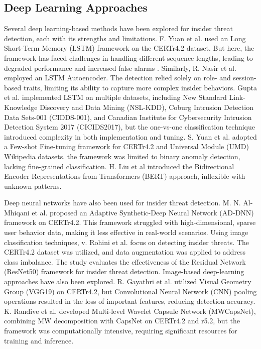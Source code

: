 \subsection{Deep Learning Approaches}
Several deep learning-based methods have been explored for insider threat detection, each with its strengths and limitations. F. Yuan et al. \cite{yuan2019attention} used an Long Short-Term Memory (LSTM) framework on the CERTr4.2 dataset. But here, the framework has faced challenges in handling different sequence lengths, leading to degraded performance and increased false alarms \cite{sivakrishna2023aubit}. Similarly, R. Nasir et al. \cite{nasir2021behavioral} employed an LSTM Autoencoder. The detection relied solely on role- and session-based traits, limiting its ability to capture more complex insider behaviors. Gupta et al. \cite{gupta2021lio} implemented LSTM on multiple datasets, including New Standard Link-Knowledge Discovery and Data Mining (NSL-KDD), Coburg Intrusion Detection Data Sets-001 (CIDDS-001), and Canadian Institute for Cybersecurity Intrusion Detection System 2017 (CICIDS2017), but the one-vs-one classification technique introduced complexity in both implementation and tuning. S. Yuan et al. \cite{yuan2020few} adopted a Few-shot Fine-tuning framework for CERTr4.2 and Universal Module (UMD) Wikipedia datasets. the framework was limited to binary anomaly detection, lacking fine-grained classification. H. Liu et al \cite{liu2025ripple2detect} introduced the Bidirectional Encoder Representations from Transformers (BERT) approach, inflexible with unknown patterns.


Deep neural networks have also been used for insider threat detection. M. N. Al-Mhiqani et al. \cite{al2021integrated} proposed an Adaptive Synthetic-Deep Neural Network (AD-DNN) framework on CERTr4.2. This framework struggled with high-dimensional, sparse user behavior data, making it less effective in real-world scenarios. Using image classification techniques, v. Rohini et al. \cite{rohini2024insider, randive2023efficient} focus on detecting insider threats. The CERTr4.2 dataset was utilized, and data augmentation was applied to address class imbalance. The study evaluates the effectiveness of the Residual Network (ResNet50) framework for insider threat detection. Image-based deep-learning approaches have also been explored. R. Gayathri et al. \cite{gayathri2020image} utilized Visual Geometry Group (VGG19) on CERTr4.2, but Convolutional Neural Network (CNN) pooling operations resulted in the loss of important features, reducing detection accuracy. K. Randive et al. \cite{randive2023mwcapsnet} developed Multi-level Wavelet Capsule Network (MWCapsNet), combining MW decomposition with CapsNet on CERTr4.2 and r5.2, but the framework was computationally intensive, requiring significant resources for training and inference.

